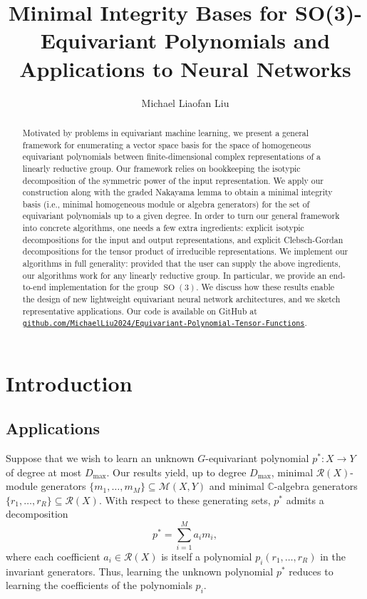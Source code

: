 \documentclass[11pt]{article}
\title{Minimal Integrity Bases for SO(3)-Equivariant Polynomials and Applications to Neural Networks}
\author{Michael Liaofan Liu}
\date{}
\newcommand{\dsC}{\mathbb{C}}
\newcommand{\scM}{\mathcal{M}}
\newcommand{\scR}{\mathcal{R}}
\newcommand{\SO}{\operatorname{SO}}
\newcommand{\set}[1]{\{#1\}}
\theoremstyle{definition}
\begin{document}
\maketitle

\begin{abstract}

  Motivated by problems in equivariant machine learning, we present a general framework for enumerating a vector space basis for the space of homogeneous equivariant polynomials between finite-dimensional complex representations of a linearly reductive group. Our framework relies on bookkeeping the isotypic decomposition of the symmetric power of the input representation. We apply our construction along with the graded Nakayama lemma to obtain a minimal integrity basis (i.e., minimal homogeneous module or algebra generators) for the set of equivariant polynomials up to a given degree. In order to turn our general framework into concrete algorithms, one needs a few extra ingredients: explicit isotypic decompositions for the input and output representations, and explicit Clebsch-Gordan decompositions for the tensor product of irreducible representations. We implement our algorithms in full generality: provided that the user can supply the above ingredients, our algorithms work for any linearly reductive group. In particular, we provide an end-to-end implementation for the group $\SO(3)$.  We discuss how these results enable the design of new lightweight equivariant neural network architectures, and we sketch representative applications.  Our code is available on GitHub at \href{https://github.com/MichaelLiu2024/Equivariant-Polynomial-Tensor-Functions}{\texttt{github.com/MichaelLiu2024/Equivariant-Polynomial-Tensor-Functions}}.

\end{abstract}

\section{Introduction}

\subsection{Applications}

Suppose that we wish to learn an unknown $G$-equivariant polynomial $p^*\colon X\to Y$ of degree at most $D_{\max}$. Our results yield, up to degree $D_{\max}$, minimal $\scR(X)$-module generators $\set{m_1,\dots,m_M}\subseteq \scM(X,Y)$ and minimal $\dsC$-algebra generators $\set{r_1,\dots,r_R}\subseteq \scR(X)$. With respect to these generating sets, $p^*$ admits a decomposition
\[
  p^*=\sum_{i=1}^M a_i m_i,
\]
where each coefficient $a_i\in \scR(X)$ is itself a polynomial $p_i(r_1,\dots,r_R)$ in the invariant generators. Thus, learning the unknown polynomial $p^*$ reduces to learning the coefficients of the polynomials $p_i$.
\end{document}

